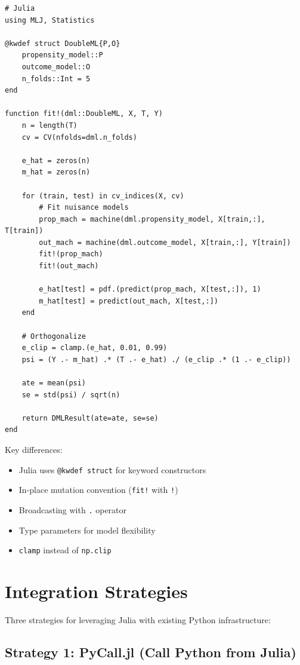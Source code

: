 \begin{verbatim}
# Julia
using MLJ, Statistics

@kwdef struct DoubleML{P,O}
    propensity_model::P
    outcome_model::O
    n_folds::Int = 5
end

function fit!(dml::DoubleML, X, T, Y)
    n = length(T)
    cv = CV(nfolds=dml.n_folds)

    e_hat = zeros(n)
    m_hat = zeros(n)

    for (train, test) in cv_indices(X, cv)
        # Fit nuisance models
        prop_mach = machine(dml.propensity_model, X[train,:], T[train])
        out_mach = machine(dml.outcome_model, X[train,:], Y[train])
        fit!(prop_mach)
        fit!(out_mach)

        e_hat[test] = pdf.(predict(prop_mach, X[test,:]), 1)
        m_hat[test] = predict(out_mach, X[test,:])
    end

    # Orthogonalize
    e_clip = clamp.(e_hat, 0.01, 0.99)
    psi = (Y .- m_hat) .* (T .- e_hat) ./ (e_clip .* (1 .- e_clip))

    ate = mean(psi)
    se = std(psi) / sqrt(n)

    return DMLResult(ate=ate, se=se)
end
\end{verbatim}

Key differences:
\begin{itemize}
    \item Julia uses \texttt{@kwdef struct} for keyword constructors
    \item In-place mutation convention (\texttt{fit!} with \texttt{!})
    \item Broadcasting with \texttt{.} operator
    \item Type parameters for model flexibility
    \item \texttt{clamp} instead of \texttt{np.clip}
\end{itemize}


\section{Integration Strategies}\label{sec:integration_strategies}

Three strategies for leveraging Julia with existing Python infrastructure:

\subsection{Strategy 1: PyCall.jl (Call Python from Julia)}

